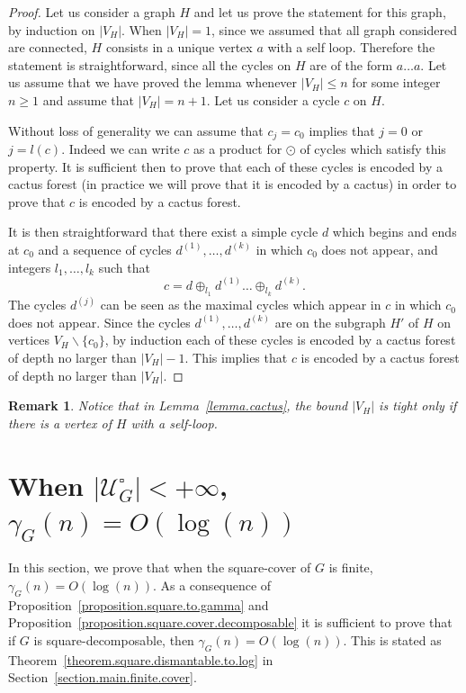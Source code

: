 \documentclass{article}
\newtheorem{remark}[theorem]{Remark}
\newcommand\quadcover[1]{\mathcal{U}^\square_{#1}}
\begin{document}
\begin{proof}
Let us consider a graph $H$ and let us prove the statement for this graph, by induction on $|V_H|$. 
When $|V_H|=1$, since we assumed that all graph considered are connected, $H$ consists in a unique vertex $a$ with a self loop. Therefore the statement is straightforward, since all the cycles on $H$ are of the form $a \ldots a$. 
Let us assume that we have proved the lemma whenever $|V_H| \le n$ for some integer $n \geq 1$ and assume that $|V_H|=n+1$. Let us consider a cycle $c$ on $H$. 

Without loss of generality we can assume that $c_j = c_0$ implies that $j=0$ or $j=l(c)$. Indeed we can write $c$ as a product for $\odot$ of cycles which satisfy this property. It is sufficient then to prove that each of these cycles is encoded by a cactus forest (in practice we will prove that it is encoded by a cactus) in order to prove that $c$ is encoded by a cactus forest.

It is then straightforward that there exist a simple cycle $d$ 
which begins and ends at $c_0$ and a sequence of cycles 
$d^{(1)}, \ldots , d^{(k)}$ in which $c_0$ does not appear, and integers $l_1, \ldots , l_k$ such that 
\[c = d \oplus_{l_1} d^{(1)} \ldots \oplus_{l_k} d^{(k)}.\]
The cycles $d^{(j)}$ can be seen as the maximal cycles 
which appear in $c$ in which $c_0$ does not appear.
Since the cycles $d^{(1)}, \ldots , d^{(k)}$
are on the subgraph $H'$ of $H$ on vertices $V_H \backslash \{c_0\}$, by induction each of these cycles is encoded by a cactus forest of depth no larger than $|V_H|-1$. This implies that 
$c$ is encoded by a cactus forest of depth no larger than $|V_H|$.\qedhere
\end{proof}

\begin{remark}
Notice that in Lemma~\ref{lemma.cactus}, the bound $|V_H|$ is tight only if there is a vertex of $H$ with a self-loop.
\end{remark}



\section{ When $|\quadcover{G}| < +\infty$, $\gamma_G(n) = O(\log(n))$\label{section.finite.square.cover}}


In this section, we prove that when the square-cover of $G$ is finite, $\gamma_G (n) = O(\log(n))$. As a consequence of Proposition~\ref{proposition.square.to.gamma} and Proposition~\ref{proposition.square.cover.decomposable} it is sufficient to prove that if $G$ is square-decomposable, then $\gamma_G(n) = O(\log(n))$. This is stated as Theorem~\ref{theorem.square.dismantable.to.log} in Section~\ref{section.main.finite.cover}.
\end{document}
